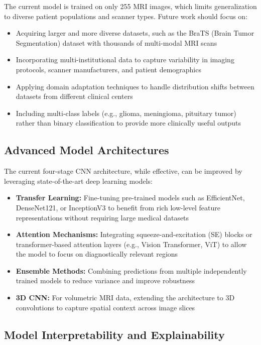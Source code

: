 \documentclass[12pt,a4paper]{article}
\begin{document}
The current model is trained on only 255 MRI images, which limits generalization to diverse patient populations and scanner types. Future work should focus on:

\begin{itemize}
    \item Acquiring larger and more diverse datasets, such as the BraTS (Brain Tumor Segmentation) dataset with thousands of multi-modal MRI scans
    \item Incorporating multi-institutional data to capture variability in imaging protocols, scanner manufacturers, and patient demographics
    \item Applying domain adaptation techniques to handle distribution shifts between datasets from different clinical centers
    \item Including multi-class labels (e.g., glioma, meningioma, pituitary tumor) rather than binary classification to provide more clinically useful outputs
\end{itemize}

\subsection{Advanced Model Architectures}

The current four-stage CNN architecture, while effective, can be improved by leveraging state-of-the-art deep learning models:

\begin{itemize}
    \item \textbf{Transfer Learning:} Fine-tuning pre-trained models such as EfficientNet, DenseNet121, or InceptionV3 to benefit from rich low-level feature representations without requiring large medical datasets
    \item \textbf{Attention Mechanisms:} Integrating squeeze-and-excitation (SE) blocks or transformer-based attention layers (e.g., Vision Transformer, ViT) to allow the model to focus on diagnostically relevant regions
    \item \textbf{Ensemble Methods:} Combining predictions from multiple independently trained models to reduce variance and improve robustness
    \item \textbf{3D CNN:} For volumetric MRI data, extending the architecture to 3D convolutions to capture spatial context across image slices
\end{itemize}

\subsection{Model Interpretability and Explainability}
\end{document}
